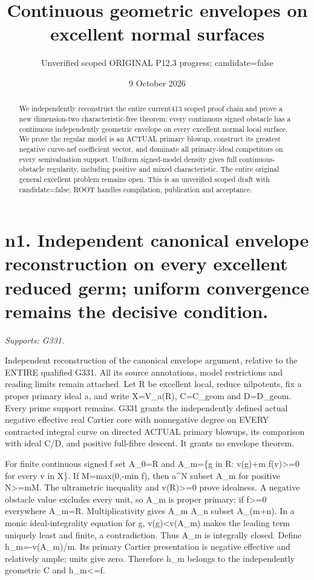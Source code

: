 \documentclass[11pt]{article}
\title{Continuous geometric envelopes on excellent normal surfaces}
\author{Unverified scoped ORIGINAL P12.3 progress; candidate=false}
\date{9 October 2026}
\begin{document}
\maketitle
\begin{abstract}
We independently reconstruct the entire current413 scoped proof chain and
prove a new dimension-two characteristic-free theorem: every continuous
signed obstacle has a continuous independently geometric envelope on every
excellent normal local surface. We prove the regular model is an ACTUAL
primary blowup, construct its greatest negative curve-nef coefficient vector,
and dominate all primary-ideal competitors on every semivaluation support.
Uniform signed-model density gives full continuous-obstacle regularity,
including positive and mixed characteristic. The entire original general
excellent problem remains open. This is an unverified scoped draft with
candidate=false; ROOT handles compilation, publication and acceptance.
\end{abstract}
\tableofcontents
\newpage
\section{n1. Independent canonical envelope reconstruction on every excellent reduced germ; uniform convergence remains the decisive condition.}
\textit{Supports: G331.}

Independent reconstruction of the canonical envelope argument, relative to the ENTIRE qualified G331. All its source annotations, model restrictions and reading limits remain attached. Let R be excellent local, reduce nilpotents, fix a proper primary ideal a, and write X=V\_a(R), C=C\_geom and D=D\_geom. Every prime support remains. G331 grants the independently defined actual negative effective real Cartier core with nonnegative degree on EVERY contracted integral curve on directed ACTUAL primary blowups, its comparison with ideal C/D, and positive full-fibre descent. It grants no envelope theorem.

For finite continuous signed f set A\_0=R and A\_m=\{g in R: v(g)+m f(v)>=0 for every v in X\}. If M=max(0,-min f), then a\textasciicircum{}N subset A\_m for positive N>=mM. The ultrametric inequality and v(R)>=0 prove idealness. A negative obstacle value excludes every unit, so A\_m is proper primary; if f>=0 everywhere A\_m=R. Multiplicativity gives A\_m A\_n subset A\_(m+n). In a monic ideal-integrality equation for g, v(g)<v(A\_m) makes the leading term uniquely least and finite, a contradiction. Thus A\_m is integrally closed. Define h\_m=-v(A\_m)/m. Its primary Cartier presentation is negative effective and relatively ample; units give zero. Therefore h\_m belongs to the independently geometric C and h\_m<=f.
\end{document}
